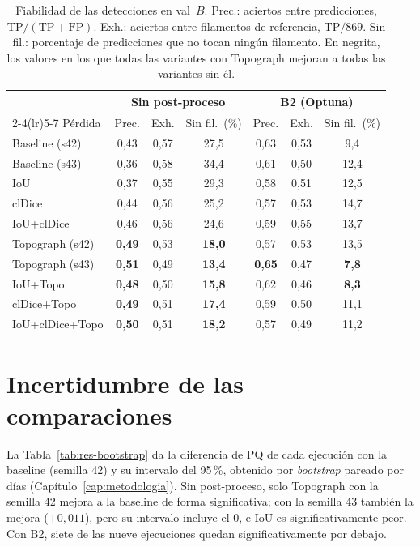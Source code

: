 \begin{table}[htbp]
\centering
\small
\begin{tabular}{@{}lcccccc@{}}
\toprule
 & \multicolumn{3}{c}{Sin post-proceso} & \multicolumn{3}{c}{B2 (Optuna)}\\
\cmidrule(lr){2-4}\cmidrule(lr){5-7}
Pérdida & Prec. & Exh. & Sin fil.\ (\%) & Prec. & Exh. & Sin fil.\ (\%)\\
\midrule
Baseline (s42) & 0,43 & 0,57 & 27,5 & 0,63 & 0,53 & 9,4\\
Baseline (s43) & 0,36 & 0,58 & 34,4 & 0,61 & 0,50 & 12,4\\
IoU & 0,37 & 0,55 & 29,3 & 0,58 & 0,51 & 12,5\\
clDice & 0,44 & 0,56 & 25,2 & 0,57 & 0,53 & 14,7\\
IoU+clDice & 0,46 & 0,56 & 24,6 & 0,59 & 0,55 & 13,7\\
\midrule
Topograph (s42) & \textbf{0,49} & 0,53 & \textbf{18,0} & 0,57 & 0,53 & 13,5\\
Topograph (s43) & \textbf{0,51} & 0,49 & \textbf{13,4} & \textbf{0,65} & 0,47 & \textbf{7,8}\\
IoU+Topo & \textbf{0,48} & 0,50 & \textbf{15,8} & 0,62 & 0,46 & \textbf{8,3}\\
clDice+Topo & \textbf{0,49} & 0,51 & \textbf{17,4} & 0,59 & 0,50 & 11,1\\
IoU+clDice+Topo & \textbf{0,50} & 0,51 & \textbf{18,2} & 0,57 & 0,49 & 11,2\\
\bottomrule
\end{tabular}
\caption{Fiabilidad de las detecciones en val~$B$. Prec.: aciertos entre
predicciones, $\mathrm{TP}/(\mathrm{TP}+\mathrm{FP})$. Exh.: aciertos
entre filamentos de referencia, $\mathrm{TP}/869$. Sin fil.: porcentaje
de predicciones que no tocan ningún filamento. En negrita, los valores
en los que todas las variantes con Topograph mejoran a todas las
variantes sin él.}
\label{tab:res-fiabilidad}
\end{table}

\section{Incertidumbre de las comparaciones}
\label{sec:res-bootstrap}

La Tabla~\ref{tab:res-bootstrap} da la diferencia de PQ de cada
ejecución con la baseline (semilla 42) y su intervalo del 95\,\%,
obtenido por \emph{bootstrap} pareado por días
(Capítulo~\ref{cap:metodologia}). Sin post-proceso, solo Topograph con
la semilla 42 mejora a la baseline de forma significativa; con la
semilla 43 también la mejora ($+0{,}011$), pero su intervalo incluye el
0, e IoU es significativamente peor. Con B2, siete de las nueve
ejecuciones quedan significativamente por debajo.

